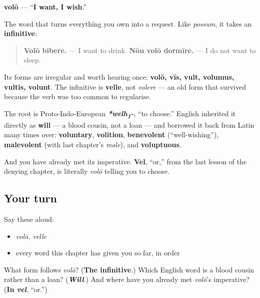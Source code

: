 \begin{cousinweb}
\textbf{volō} — \textquotedblleft{}\textbf{I want, I wish}.\textquotedblright{}

The word that turns everything you own into a request. Like \emph{possum}, it takes an \textbf{infinitive}:

\begin{quote}
\textbf{Volō bibere.} — I want to drink. \textbf{Nōn volō dormīre.} — I do not want to sleep.
\end{quote}

Its forms are irregular and worth hearing once: \textbf{volō, vīs, vult, volumus, vultis, volunt}. The infinitive is \textbf{velle}, not \emph{volere} — an old form that survived because the verb was too common to regularise.

The root is Proto-Indo-European \emph{\textbf{*welh\textsubscript{1}-}}, \textquotedblleft{}to choose.\textquotedblright{} English inherited it directly as \textbf{will} — a blood cousin, not a loan — and borrowed it back from Latin many times over: \textbf{voluntary}, \textbf{volition}, \textbf{benevolent} (\textquotedblleft{}well-wishing\textquotedblright{}), \textbf{malevolent} (with last chapter's \emph{male}), and \textbf{voluptuous}.

And you have already met its imperative. \textbf{Vel}, \textquotedblleft{}or,\textquotedblright{} from the last lesson of the denying chapter, is literally \emph{volō} telling you to choose.
\end{cousinweb}

\subsection*{Your turn}
Say these aloud:

\begin{itemize}
\raggedright
  \item \emph{volō, velle}
  \item every word this chapter has given you so far, in order
\end{itemize}

\begin{tcolorbox}[breakable,colback=teal!4,colframe=teal!35!black,title={Before you move on}]
What form follows \emph{volō}? (\textbf{The infinitive}.) Which English word is a blood cousin rather than a loan? (\emph{\textbf{Will}}.) And where have you already met \emph{volō}'s imperative? (\textbf{In \emph{vel}}, \textquotedblleft{}or.\textquotedblright{})
\end{tcolorbox}
